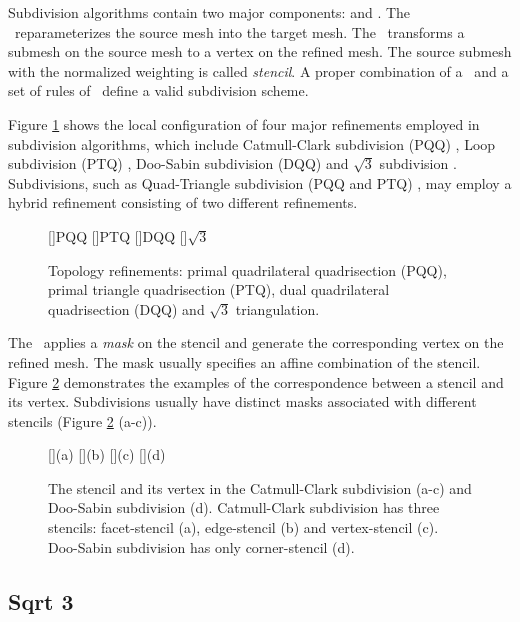 Subdivision algorithms contain two major
components: \emph{\tr} and \emph{\gm}.
The \tr\ reparameterizes the source mesh into the target 
mesh. The \gm\ transforms a submesh on the source mesh
to a vertex on the refined mesh. The source submesh with
the normalized weighting is called 
\emph{stencil}. A proper combination of a \tr\ and a set of 
rules of \gm\ define a valid subdivision scheme.

Figure \ref{fig:RefSchemes} shows the local configuration 
of four major refinements
employed in subdivision algorithms, which include Catmull-Clark
subdivision (PQQ) \cite{cc}, Loop subdivision (PTQ) \cite{loop},
Doo-Sabin subdivision (DQQ) \cite{ds} and $\sqrt{3}$ subdivision
\cite{sqrt3}. Subdivisions, such as Quad-Triangle subdivision (PQQ and
PTQ) \cite{qts,l-pg-03}, may employ a hybrid refinement consisting
of two different refinements.
\begin{figure}
  \centering
  []{\scriptsize PQQ} 
  []{\scriptsize PTQ}
  []{\scriptsize DQQ} 
  []{\scriptsize $\sqrt{3}$} 
  \caption{Topology refinements: 
    primal quadrilateral quadrisection (PQQ),
    primal triangle quadrisection (PTQ),
    dual quadrilateral quadrisection (DQQ) and
    $\sqrt{3}$ triangulation.}
  \label{fig:RefSchemes}
\end{figure}
The \gm\ applies a \emph{mask} on the stencil and
generate the corresponding vertex on the refined mesh.
The mask usually specifies an affine combination of the 
stencil. Figure \ref{fig:RefMap} demonstrates the examples of the
correspondence between a stencil and its vertex. Subdivisions 
usually have distinct masks associated with different stencils 
(Figure \ref{fig:RefMap} (a-c)). 
\begin{figure}
  \centering
  []{(a)}
  []{(b)}
  []{(c)}
  []{(d)}
  \caption{The stencil and its vertex in the 
           Catmull-Clark subdivision (a-c)
           and Doo-Sabin subdivision (d). Catmull-Clark
           subdivision has three stencils: facet-stencil (a), 
           edge-stencil (b) and vertex-stencil (c). 
           Doo-Sabin subdivision has only corner-stencil (d).}
  \label{fig:RefMap}
\end{figure}




\subsection{Sqrt 3}


%

